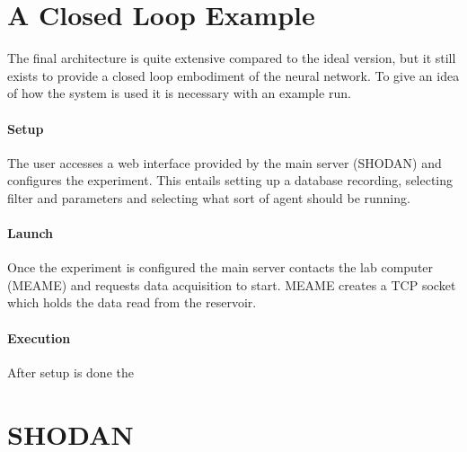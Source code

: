 \section{A Closed Loop Example}
The final architecture is quite extensive compared to the ideal version, but it
still exists to provide a closed loop embodiment of the neural network. To give
an idea of how the system is used it is necessary with an example run.
\paragraph{Setup}
The user accesses a web interface provided by the main server (SHODAN) and
configures the experiment. This entails setting up a database recording,
selecting filter and parameters and selecting what sort of agent should be running.
\paragraph{Launch}
Once the experiment is configured the main server contacts the lab computer (MEAME)
and requests data acquisition to start. MEAME creates a TCP socket which holds
the data read from the reservoir.
\paragraph{Execution}
After setup is done the 
\section{SHODAN}

\cleardoublepage

